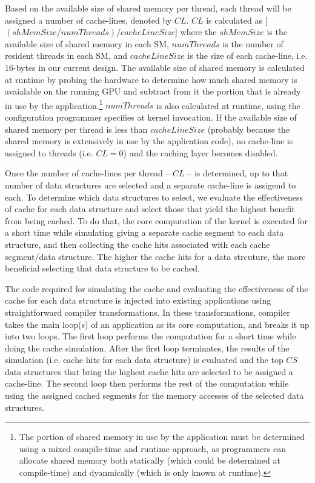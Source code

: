 Based on the available size of shared memory per thread, each thread will be assigned a number of
cache-lines, denoted by $CL$. $CL$ is calculated as [$(shMemSize / numThreads) / cacheLineSize$]
where the $shMemSize$ is the available size of shared memory in each SM, $numThreads$ is the number
of resident threads in each SM, and $cacheLineSize$ is the size of each cache-line, i.e. 16-bytes in
our current design. The available size of shared memory is calculated at runtime by probing the
hardware to determine how much shared memory is avaialable on the running GPU and subtract from it
the portion that is already in use by the application.\footnote{The portion of shared memory in use
by the application must be determined using a mixed compile-time and runtime approach, as
programmers can allocate shared memory both statically (which could be determined at compile-time)
and dyanmically (which is only known at runtime).} $numThreads$ is also calculated at runtime, using
the configuration programmer specifies at kernel invocation. If the available size of shared memory
per thread is less than $cacheLineSize$ (probably because the shared memory is
extensively in use by the application code), no cache-line is assigned to threads (i.e. $CL = 0$)
and the caching layer becomes disabled.

Once the number of cache-lines per thread -- $CL$ -- is determined, up to that number of data
structures are selected and a separate cache-line is assigend to each. To determine which data
structures to select, we evaluate the effectiveness of cache for each data structure and select
those that yield the highest benefit from being cached. To do that, the core computation of the
kernel is executed for a short time while simulating giving a separate cache segment to each data
structure, and then collecting the cache hits associated with each cache segment/data structure. The
higher the cache hits for a data strcuture, the more beneficial selecting that data structure to be
cached.


The code required for simulating the cache and evaluating the effectiveness of the cache for each
data structure is injected into existing applications using straightforward compiler transformations.
In these transformations, compiler takes the main loop(s) of an application as its core computation,
and breaks it up into two loops. The first loop performs the computation for a short time while
doing the cache simulation. After the first loop terminates, the results of the simulation (i.e.
cache hits for each data structure) is evaluated and the top $CS$ data structures that bring the
highest cache hits are selected to be assigned a cache-line. The second loop then performs the
rest of the computation while using the assigned cached segments for the memory accesses of the
selected data structures.


